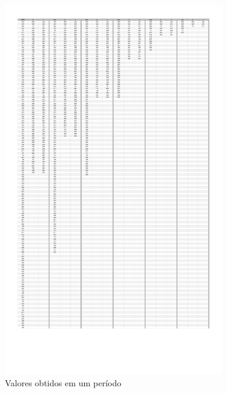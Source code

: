 \begin{figure}[H]
            \centering
                \includegraphics[width=0.84\textwidth]{tabelaExecXorShift.pdf}
                \caption{Valores obtidos em um período}
                \label{fig:Desempenho}
        \end{figure}

